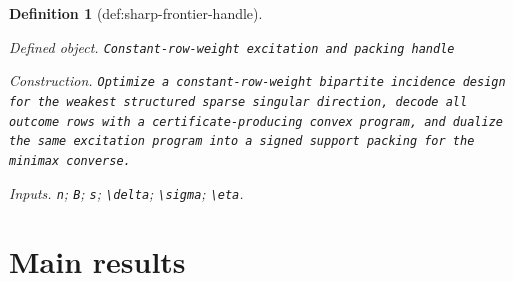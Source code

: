 \documentclass{article}
\newtheorem{definition}{Definition}
\begin{document}
\begin{definition}[def:sharp-frontier-handle]\label{def:sharp-frontier-handle}
\par\smallskip\noindent\emph{Defined object.} \texttt{Constant-\allowbreak{}row-\allowbreak{}weight excitation and packing handle}
\par\smallskip\noindent\emph{Construction.} \texttt{Optimize a constant-\allowbreak{}row-\allowbreak{}weight bipartite incidence design for the weakest structured sparse singular direction,\allowbreak{} decode all outcome rows with a certificate-\allowbreak{}producing convex program,\allowbreak{} and dualize the same excitation program into a signed support packing for the minimax converse.}
\par\smallskip\noindent\emph{Inputs.} \texttt{n}; \texttt{B}; \texttt{s}; \texttt{\textbackslash{}\allowbreak{}delta}; \texttt{\textbackslash{}\allowbreak{}sigma}; \texttt{\textbackslash{}\allowbreak{}eta}.
\end{definition}

\section{Main results}
\end{document}
